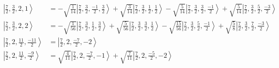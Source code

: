 \documentclass{report}
\newcommand{\ket}[1]{\left| #1 \right>} %
\begin{document}
\begin{align*}
\ket{ \frac{7}{2} ,  \frac{3}{2} ,  2 ,  1  } &=  - \sqrt{  \frac{1}{14}  } \ket{ \frac{7}{2} ,  \frac{3}{2} ,  \frac{-1}{2} ,  \frac{3}{2}  } + \sqrt{  \frac{3}{14}  } \ket{ \frac{7}{2} ,  \frac{3}{2} ,  \frac{1}{2} ,  \frac{1}{2}  } - \sqrt{  \frac{5}{14}  } \ket{ \frac{7}{2} ,  \frac{3}{2} ,  \frac{3}{2} ,  \frac{-1}{2}  } + \sqrt{  \frac{5}{14}  } \ket{ \frac{7}{2} ,  \frac{3}{2} ,  \frac{5}{2} ,  \frac{-3}{2}  } \\
\ket{ \frac{7}{2} ,  \frac{3}{2} ,  2 ,  2  } &=  - \sqrt{  \frac{1}{56}  } \ket{ \frac{7}{2} ,  \frac{3}{2} ,  \frac{1}{2} ,  \frac{3}{2}  } + \sqrt{  \frac{5}{56}  } \ket{ \frac{7}{2} ,  \frac{3}{2} ,  \frac{3}{2} ,  \frac{1}{2}  } - \sqrt{  \frac{15}{56}  } \ket{ \frac{7}{2} ,  \frac{3}{2} ,  \frac{5}{2} ,  \frac{-1}{2}  } + \sqrt{  \frac{5}{8}  } \ket{ \frac{7}{2} ,  \frac{3}{2} ,  \frac{7}{2} ,  \frac{-3}{2}  } \\
\ket{ \frac{7}{2} ,  2 ,  \frac{11}{2} ,  \frac{-11}{2}  } &=  \ket{ \frac{7}{2} ,  2 ,  \frac{-7}{2} ,  -2  } \\
\ket{ \frac{7}{2} ,  2 ,  \frac{11}{2} ,  \frac{-9}{2}  } &=  \sqrt{  \frac{4}{11}  } \ket{ \frac{7}{2} ,  2 ,  \frac{-7}{2} ,  -1  } + \sqrt{  \frac{7}{11}  } \ket{ \frac{7}{2} ,  2 ,  \frac{-5}{2} ,  -2  }
\end{align*}
\end{document}
